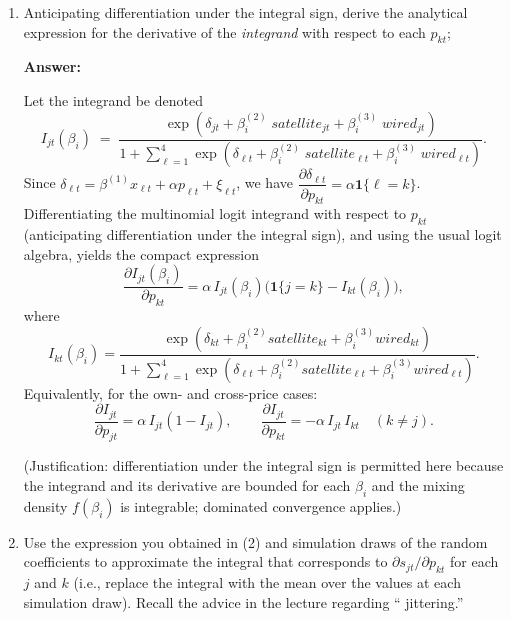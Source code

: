 \documentclass[english,11pt]{article}
\begin{document}
\begin{enumerate}
\begin{enumerate}
\begin{enumerate}
\item Anticipating differentiation under the integral sign, derive the
analytical expression for the derivative of the \textit{integrand} with
respect to each $p_{kt}$; 

\textbf{Answer:}

Let the integrand be denoted
\begin{equation*}
I_{jt}(\beta_i) \;=\; \frac{\exp(\delta_{jt} + \beta_i^{(2)}\;satellite_{jt} + \beta_i^{(3)}\;wired_{jt})}
{1 + \sum_{\ell=1}^4 \exp(\delta_{\ell t} + \beta_i^{(2)}\;satellite_{\ell t} + \beta_i^{(3)}\;wired_{\ell t})}.
\end{equation*}
Since
\(\delta_{\ell t} = \beta^{(1)}x_{\ell t} + \alpha p_{\ell t} + \xi_{\ell t}\),
we have
\(\dfrac{\partial \delta_{\ell t}}{\partial p_{kt}} = \alpha\mathbf{1}\{\ell=k\}\).
Differentiating the multinomial logit integrand with respect to \(p_{kt}\) (anticipating differentiation under the integral sign), and using the usual logit algebra, yields the compact expression
\begin{equation*}
\frac{\partial I_{jt}(\beta_i)}{\partial p_{kt}}
= \alpha\, I_{jt}(\beta_i)\Big(\mathbf{1}\{j=k\} - I_{kt}(\beta_i)\Big),
\end{equation*}
where
\begin{equation*}
I_{kt}(\beta_i) = \frac{\exp(\delta_{kt} + \beta_i^{(2)}satellite_{kt} + \beta_i^{(3)}wired_{kt})}
{1 + \sum_{\ell=1}^4 \exp(\delta_{\ell t} + \beta_i^{(2)}satellite_{\ell t} + \beta_i^{(3)}wired_{\ell t})}.
\end{equation*}
Equivalently, for the own- and cross-price cases:
\[
\frac{\partial I_{jt}}{\partial p_{jt}} = \alpha\, I_{jt}(1 - I_{jt}), \qquad
\frac{\partial I_{jt}}{\partial p_{kt}} = -\alpha\, I_{jt}\,I_{kt}\quad (k\neq j).
\]
\par\noindent
(Justification: differentiation under the integral sign is permitted here because the integrand and its derivative are bounded for each \(\beta_i\) and the mixing density \(f(\beta_i)\) is integrable; dominated convergence applies.)


\item Use the expression you obtained in (2) and simulation draws of the
random coefficients to approximate the integral that corresponds to $%
\partial s_{jt}/\partial p_{kt}$ for each $j$ and $k$ (i.e., replace
the integral with the mean over the values at each simulation draw). Recall the advice in the lecture regarding \textquotedblleft
jittering.\textquotedblright\ \newline


\end{enumerate}
\end{enumerate}
\end{enumerate}
\end{document}
